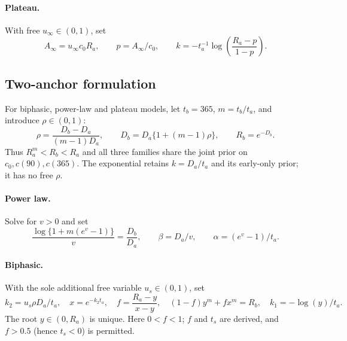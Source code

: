 \documentclass[11pt,a4paper]{article}
\newcommand{\reporttable}[1]{%
  }
\begin{document}
\paragraph{Plateau.} With free $u_\infty\in(0,1)$, set
\begin{equation}
  A_\infty=u_\infty c_0R_a,\qquad p=A_\infty/c_0,\qquad
  k=-t_a^{-1}\log\!\left(\frac{R_a-p}{1-p}\right).
\end{equation}

\begin{table}[H]
\centering\small
\caption{Additional priors for the early-only default and broader
specifications. The rate-ratio centre is the value used in the code,
$16.6\simeq581/35$.}
\label{tab:early}
\reporttable{early-shape-priors}
\end{table}

\subsection{Two-anchor formulation}
For biphasic, power-law and plateau models, let $t_b=365$, $m=t_b/t_a$,
and introduce $\rho\in(0,1)$:
\begin{equation}
  \rho=\frac{D_b-D_a}{(m-1)D_a},\qquad
  D_b=D_a\{1+(m-1)\rho\},\qquad R_b=e^{-D_b}.
\end{equation}
Thus $R_a^m<R_b<R_a$ and all three families share the joint prior on
$c_0,c(90),c(365)$. The exponential retains $k=D_a/t_a$ and its
early-only prior; it has no free $\rho$.

\paragraph{Power law.} Solve for $v>0$ and set
\begin{equation}
  \frac{\log\{1+m(e^v-1)\}}{v}=\frac{D_b}{D_a},\qquad
  \beta=D_a/v,\qquad \alpha=(e^v-1)/t_a.
\end{equation}

\paragraph{Biphasic.} With the sole additional free variable
$u_s\in(0,1)$, set
\begin{equation}
  k_2=u_s\rho D_a/t_a,\quad x=e^{-k_2t_a},\quad
  f=\frac{R_a-y}{x-y},\quad
  (1-f)y^m+fx^m=R_b,\quad k_1=-\log(y)/t_a.
  \label{eq:anchor-mix}
\end{equation}
The root $y\in(0,R_a)$ is unique. Here $0<f<1$; $f$ and $t_s$ are
derived, and $f>0.5$ (hence $t_s<0$) is permitted.
\end{document}
